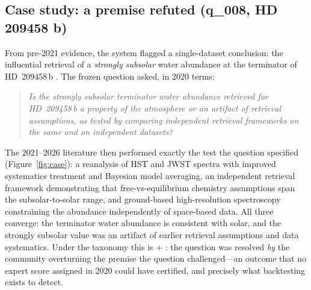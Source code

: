 \subsection{Case study: a premise refuted (q\_008, HD 209458 b)}
\label{sec:results:case}

From pre-2021 evidence, the system flagged a single-dataset conclusion:
the influential retrieval of a \emph{strongly subsolar} water abundance
at the terminator of HD~209458\,b \citep{macdonald2017}. The frozen
question asked, in 2020 terms:

\begin{quote}\itshape
Is the strongly subsolar terminator water abundance retrieved for
HD~209458\,b a property of the atmosphere or an artifact of retrieval
assumptions, as tested by comparing independent retrieval frameworks on
the same and on independent datasets?
\end{quote}

The 2021--2026 literature then performed exactly the test the question
specified (Figure~\ref{fig:case}): a reanalysis of HST and JWST spectra
with improved systematics treatment and Bayesian model averaging, an
independent retrieval framework demonstrating that free-vs-equilibrium
chemistry assumptions span the subsolar-to-solar range, and ground-based
high-resolution spectroscopy constraining the abundance independently of
space-based data. All three converge: the terminator water abundance is
consistent with solar, and the strongly subsolar value was an artifact
of earlier retrieval assumptions and data systematics. Under the
taxonomy this is  + : the question
was resolved \emph{by} the community overturning the premise the
question challenged---an outcome that no expert score assigned in 2020
could have certified, and precisely what backtesting exists to detect.

